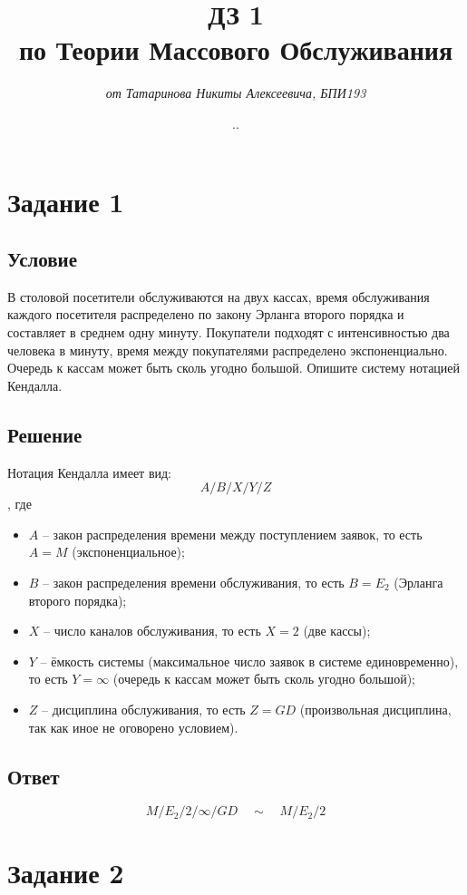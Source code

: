\documentclass{article}
\title{\textbf{ДЗ 1\\по Теории Массового Обслуживания}}
\author{\textit{от Татаринова Никиты Алексеевича, БПИ193}}
\date{\the\year .\twodigits{\the\month}.\twodigits{\the\day}}
\begin{document}
\maketitle
\section*{Задание 1}
\subsection*{Условие}
В столовой посетители обслуживаются на двух кассах, время обслуживания каждого посетителя распределено по закону Эрланга второго порядка и составляет в среднем одну минуту. Покупатели подходят с интенсивностью два человека в минуту, время между покупателями распределено экспоненциально. Очередь к кассам может быть сколь угодно большой.
Опишите систему нотацией Кендалла.
\subsection*{Решение}
Нотация Кендалла имеет вид:
\[ A/B/X/Y/Z \]
, где 
\begin{itemize}
\item $ A $ -- закон распределения времени между поступлением заявок, то есть $ A \! = \! M $ (экспоненциальное);
\item $ B $ -- закон распределения времени обслуживания, то есть $ B \! = \! E_2 $ (Эрланга второго порядка);
\item $ X $ -- число каналов обслуживания, то есть $ X \! = \! 2 $ (две кассы);
\item $ Y $ -- ёмкость системы (максимальное число заявок в системе единовременно), то есть $ Y \! = \! \infty $ (очередь к кассам может быть сколь угодно большой);
\item $ Z $ -- дисциплина обслуживания, то есть $ Z \! = \! GD $ (произвольная дисциплина, так как иное не оговорено условием).
\end{itemize}
\subsection*{Ответ}
\[ M/E_2/2/\infty/GD \quad \sim \quad M/E_2/2 \]
\section*{Задание 2}
\end{document}
